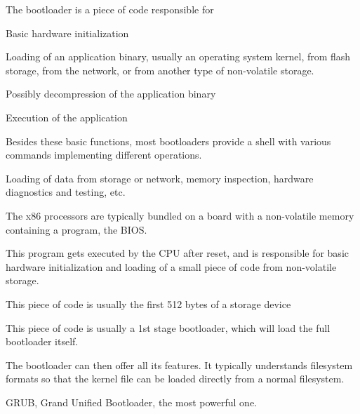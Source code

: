   \startitemize
  \item The bootloader is a piece of code responsible for
    \startitemize
    \item Basic hardware initialization
    \item Loading of an application binary, usually an operating
      system kernel, from flash storage, from the network, or from
      another type of non-volatile storage.
    \item Possibly decompression of the application binary
    \item Execution of the application
    \stopitemize
  \item Besides these basic functions, most bootloaders provide a
    shell with various commands implementing different operations.
    \startitemize
    \item Loading of data from storage or network, memory inspection,
      hardware diagnostics and testing, etc.
    \stopitemize
  \stopitemize

    \startitemize
    \item The x86 processors are typically bundled on a board with a
      non-volatile memory containing a program, the BIOS.
    \item This program gets executed by the CPU after reset, and is
      responsible for basic hardware initialization and loading of a
      small piece of code from non-volatile storage.
      \startitemize
      \item This piece of code is usually the first 512 bytes of a
        storage device
      \stopitemize
    \item This piece of code is usually a 1st stage bootloader, which
      will load the full bootloader itself.
    \item The bootloader can then offer all its features. It typically
      understands filesystem formats so that the kernel file can be
      loaded directly from a normal filesystem.
  \item GRUB, Grand Unified Bootloader, the most powerful one.\\
  \stopitemize

